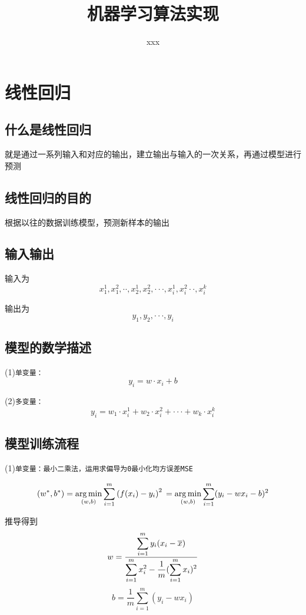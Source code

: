 \documentclass[supercite]{Experimental_Report}
\title{机器学习算法实现}
\author{xxx}
\theoremstyle{definition}
\begin{document}
\maketitle
\clearpage
{}
\tableofcontents[level=2]
\clearpage
{}

\section{线性回归}
\subsection{什么是线性回归}
就是通过一系列输入和对应的输出，建立输出与输入的一次关系，再通过模型进行预测

\subsection{线性回归的目的}
根据以往的数据训练模型，预测新样本的输出
\subsection{输入输出}
输入为$$x_1^1,x_1^2,\cdot\cdot,x_2^1,x_2^2,\cdot\cdot\cdot,x_i^1,x_i^2\cdot\cdot,x_i^k$$

输出为$$y_1,y_2,\cdot\cdot\cdot,y_i$$
\subsection{模型的数学描述}
(1)\texttt{单变量：$$y_i=w\cdot x_i+b$$}

(2)\texttt{多变量：$$y_i=w_1\cdot x_i^1+w_2\cdot x_i^2+\cdot\cdot\cdot+w_k\cdot x_i^k$$}
\subsection{模型训练流程}
(1)\texttt{单变量：最小二乘法，运用求偏导为0最小化均方误差MSE}

$$
(w^*, b^*) =\underset{(w, b)}{\arg \min } \sum_{i=1}^{m}\left(f(x_{i})-y_{i}\right)^2 \\ 
=\underset{(w, b)}{\arg \min } \sum_{i=1}^m(y_i-w x_i-b)^2 

$$

推导得到
$$
 w=\frac{\displaystyle \sum_{i=1}^m y_i(x_i-\overline{x})}{ \displaystyle \sum_{i=1}^m x_i^2-\frac{1}{m}(\sum_{i=1}^{m} x_{i})^{2}} \\
 $$
 $$
b=\frac{1}{m} \sum_{i=1}^m (y_i-w x_i)
$$
\end{document}
